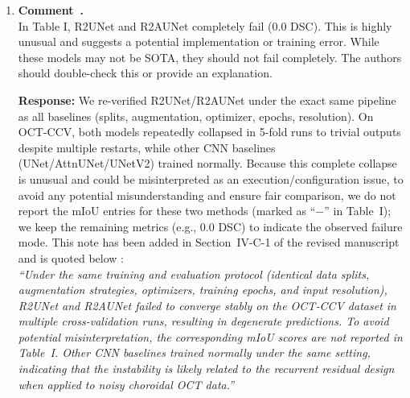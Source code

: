 \documentclass[11pt]{article}
\newcommand{\commentresponse}[2]{{\color{blue}\textbf{Response:} #2}}
\newcommand{\commentitem}{\item \textbf{Comment~\arabic{enumi}.}\\\ignorespaces}
\begin{document}
\begin{enumerate}
{    We further report inference-time scaling across Tiny, Small, and Base variants of SMC-Net, showing predictable efficiency–accuracy trade-offs. Overall, these results substantiate the practical viability of the proposed method under realistic deployment conditions.

    The added text is highlighted in the revised manuscript and quoted below (in blue):\\
    \textit{{\color{blue}``We further evaluate inference efficiency on a single NVIDIA RTX 4090 D GPU (batch size 1, $512\times512$, fp32).
    SMC-Net-S processes one OCT image in 12.6~ms (approximately 79 FPS), demonstrating its suitability for real-time or near-real-time deployment.
    Table III reports the inference-time breakdown of the SMC-Net series, showing consistent scaling behavior across Tiny, Small, and Base variants.''}}
    }\\


    \commentitem In Table I, R2UNet and R2AUNet completely fail (0.0 DSC). This is highly unusual and suggests a potential implementation or training error. While these models may not be SOTA, they should not fail completely. The authors should double-check this or provide an explanation.
    
    \commentresponse{7}{We re-verified R2UNet/R2AUNet under the exact same pipeline as all baselines (splits, augmentation, optimizer, epochs, resolution). On OCT-CCV, both models repeatedly collapsed in 5-fold runs to trivial outputs despite multiple restarts, while other CNN baselines (UNet/AttnUNet/UNetV2) trained normally. Because this complete collapse is unusual and could be misinterpreted as an execution/configuration issue, to avoid any potential misunderstanding and ensure fair comparison, we do not report the mIoU entries for these two methods (marked as ``$-$'' in Table~I); we keep the remaining metrics (e.g., 0.0 DSC) to indicate the observed failure mode. This note has been added in Section~IV-C-1 of the revised manuscript and is quoted below :\\
    \textit{{\color{blue}``Under the same training and evaluation protocol (identical data splits, augmentation strategies, optimizers, training epochs, and input resolution), R2UNet and R2AUNet failed to converge stably on the OCT-CCV dataset in multiple cross-validation runs, resulting in degenerate predictions.
    To avoid potential misinterpretation, the corresponding mIoU scores are not reported in Table~I.
    Other CNN baselines trained normally under the same setting, indicating that the instability is likely related to the recurrent residual design when applied to noisy choroidal OCT data.''}}
    }


\end{enumerate}
\end{document}

